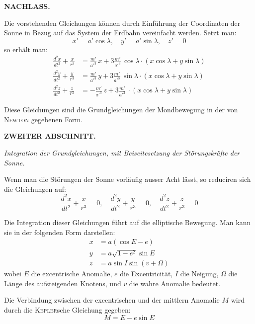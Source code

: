 \documentclass[10pt,a4paper]{article}
\begin{document}
\newpage
\noindent\textbf{NACHLASS.}

\bigskip
\noindent
[2.] Die vorstehenden Gleichungen k\"onnen durch Einf\"uhrung der Coordinaten der Sonne in Bezug auf das System der Erdbahn vereinfacht werden. Setzt man:
\begin{equation*}
x' = a'\cos\lambda,\quad y' = a'\sin\lambda,\quad z' = 0
\end{equation*}
so erh\"alt man:
\begin{align*}
\frac{d^2x}{dt^2} + \frac{x}{r^3} &= \frac{m'}{a'^3}\,x + 3\frac{m'}{a'^3}\,\cos\lambda\cdot(x\cos\lambda + y\sin\lambda) \\
\frac{d^2y}{dt^2} + \frac{y}{r^3} &= \frac{m'}{a'^3}\,y + 3\frac{m'}{a'^3}\,\sin\lambda\cdot(x\cos\lambda + y\sin\lambda) \\
\frac{d^2z}{dt^2} + \frac{z}{r^3} &= -\frac{m'}{a'^3}\,z + 3\frac{m'}{a'^3}\,\cdot(x\cos\lambda + y\sin\lambda)
\end{align*}

Diese Gleichungen sind die Grundgleichungen der Mondbewegung in der von\textsc{ Newton} gegebenen Form.

\bigskip
\noindent\textbf{ZWEITER ABSCHNITT.}

\medskip
\noindent\textit{Integration der Grundgleichungen, mit Beiseitesetzung der St\"orungskr\"afte der Sonne.}

\medskip
\noindent
[3.] Wenn man die St\"orungen der Sonne vorl\"aufig ausser Acht l\"asst, so reduciren sich die Gleichungen auf:
\begin{equation*}
\frac{d^2x}{dt^2} + \frac{x}{r^3} = 0,\quad
\frac{d^2y}{dt^2} + \frac{y}{r^3} = 0,\quad
\frac{d^2z}{dt^2} + \frac{z}{r^3} = 0
\end{equation*}

\newpage
\noindent
[4.] Die Integration dieser Gleichungen f\"uhrt auf die elliptische Bewegung. Man kann sie in der folgenden Form darstellen:
\begin{align*}
x &= a(\cos E - e) \\
y &= a\sqrt{1-e^2}\sin E \\
z &= a\sin I\sin(v + \Omega)
\end{align*}
wobei $E$ die excentrische Anomalie, $e$ die Excentricit\"at, $I$ die Neigung, $\Omega$ die L\"ange des aufsteigenden Knotens, und $v$ die wahre Anomalie bedeutet.

Die Verbindung zwischen der excentrischen und der mittlern Anomalie $M$ wird durch die\textsc{ Kepler}sche Gleichung gegeben:
\begin{equation*}
M = E - e\sin E
\end{equation*}
\end{document}
